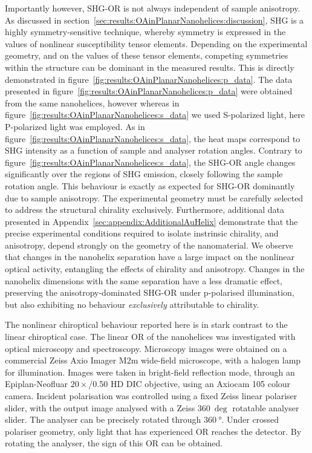 Importantly however, SHG-OR is not always independent of sample anisotropy. As discussed in section~\ref{sec:results:OAinPlanarNanohelices:discussion}, SHG is a highly symmetry-sensitive technique, whereby symmetry is expressed in the values of nonlinear susceptibility tensor elements. Depending on the experimental geometry, and on the values of these tensor elements, competing symmetries within the structure can be dominant in the measured results. This is directly demonstrated in figure~\ref{fig:results:OAinPlanarNanohelices:p_data}. 
The data presented in figure~\ref{fig:results:OAinPlanarNanohelices:p_data} were obtained from the same nanohelices, however whereas in figure~\ref{fig:results:OAinPlanarNanohelices:s_data} we used S-polarized light, here P-polarized light was employed. As in figure~\ref{fig:results:OAinPlanarNanohelices:s_data}, the heat maps correspond to SHG intensity as a function of sample and analyser rotation angles. Contrary to figure~\ref{fig:results:OAinPlanarNanohelices:s_data}, the SHG-OR angle changes significantly over the regions of SHG emission, closely following the sample rotation angle. This behaviour is exactly as expected for SHG-OR dominantly due to sample anisotropy. The experimental geometry must be carefully selected to address the structural chirality exclusively. 
Furthermore, additional data presented in Appendix~\ref{sec:appendix:AdditionalAuHelix} demonstrate that the precise experimental conditions required to isolate instrinsic chirality, and anisotropy, depend strongly on the geometry of the nanomaterial. We observe that changes in the nanohelix separation have a large impact on the nonlinear optical activity, entangling the effects of chirality and anisotropy. Changes in the nanohelix dimensions with the same separation have a less dramatic effect, preserving the anisotropy-dominated SHG-OR under p-polarised illumination, but also exhibiting no behaviour \textit{exclusively} attributable to chirality.

The nonlinear chiroptical behaviour reported here is in stark contrast to the linear chiroptical case. The linear OR of the nanohelices was investigated with optical microscopy and spectroscopy. 
Microscopy images were obtained on a commercial Zeiss Axio Imager M2m wide-field microscope, with a halogen lamp for illumination. Images were taken in bright-field reflection mode, through an Epiplan-Neofluar $20\times$/0.50 HD DIC objective, using an Axiocam 105 colour camera. Incident polarisation was controlled using a fixed Zeiss linear polariser slider, with the output image analysed with a Zeiss $\SI{360}{\deg}$ rotatable analyser slider. 
The analyser can be precisely rotated through $\SI{360}{\degree}$. Under crossed polariser geometry, only light that has experienced OR reaches the detector. By rotating the analyser, the sign of this OR can be obtained. 


